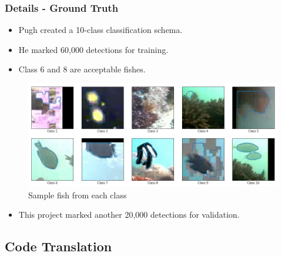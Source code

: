 \documentclass{beamer}[fullspacing]
\begin{document}
\begin{frame}
\frametitle{Details - Ground Truth}

\begin{itemize}
\item
Pugh created a 10-class classification schema.
\item
He marked 60,000 detections for training.
\item
Class 6 and 8 are acceptable fishes.
\end{itemize}

\begin{figure}
\includegraphics[scale=0.2]{image/class_sample.png}
\caption{Sample fish from each class}
\end{figure}

\vspace{-15pt}
\begin{itemize}
\item
This project marked  another 20,000 detections for validation.
\end{itemize}

\end{frame}



\subsection{Code Translation}
\end{document}
